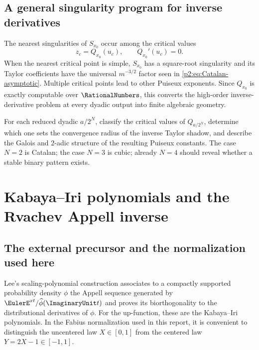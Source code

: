 \documentclass[11pt,oneside]{article}
\numberwithin{equation}{section}
\theoremstyle{definition}
\theoremstyle{remark}
\begin{document}
\subsection{A general singularity program for inverse derivatives}

The nearest singularities of $S_{x_0}$ occur among the critical values
\begin{equation}
 z_c=Q_{x_0}(u_c),
 \qquad Q_{x_0}'(u_c)=0.
 \label{p2:eq:critical-values}
\end{equation}
When the nearest critical point is simple, $S_{x_0}$ has a square-root singularity and its Taylor
coefficients have the universal $m^{-3/2}$ factor seen in \eqref{p2:eq:Catalan-asymptotic}.  Multiple
critical points lead to other Puiseux exponents.  Since $Q_{x_0}$ is exactly computable over $\RationalNumbers$,
this converts the high-order inverse-derivative problem at every dyadic output into finite algebraic
geometry.

\begin{frontierbox}
For each reduced dyadic $a/2^N$, classify the critical values of $Q_{a/2^N}$, determine which one
sets the convergence radius of the inverse Taylor shadow, and describe the Galois and $2$-adic
structure of the resulting Puiseux constants.  The case $N=2$ is Catalan; the case $N=3$ is cubic;
already $N=4$ should reveal whether a stable binary pattern exists.
\end{frontierbox}

\section{Kabaya--Iri polynomials and the Rvachev Appell inverse}
\label{p2:sec:appell}

\subsection{The external precursor and the normalization used here}

Lee's scaling-polynomial construction associates to a compactly supported probability density
$\phi$ the Appell sequence generated by $\EulerE^{xt}/\widehat\phi(\ImaginaryUnit t)$ and proves its biorthogonality
to the distributional derivatives of $\phi$.  For the up-function, these are the Kabaya--Iri
polynomials.  In the Fabius normalization used in this report, it is convenient to distinguish the
uncentered law $X\in[0,1]$ from the centered law $Y=2X-1\in[-1,1]$.
\end{document}
